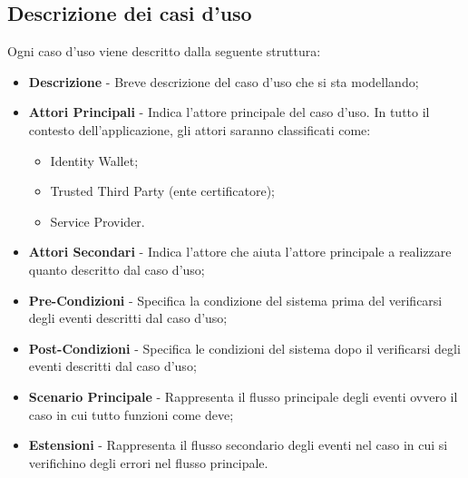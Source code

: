 \subsection{Descrizione dei casi d'uso}
Ogni caso d'uso viene descritto dalla seguente struttura:
\begin{itemize}
	\item \textbf{Descrizione} - Breve descrizione del caso d'uso che si sta modellando;
	\item \textbf{Attori Principali} - Indica l'attore principale del caso d'uso. In tutto il contesto dell'applicazione, gli attori saranno classificati come:
	\begin{itemize}
		\item Identity Wallet;
		\item Trusted Third Party (ente certificatore);
		\item Service Provider.
	\end{itemize}
	\item \textbf{Attori Secondari} - Indica l'attore che aiuta l'attore principale a realizzare quanto descritto dal caso d'uso;
	\item \textbf{Pre-Condizioni} - Specifica la condizione del sistema prima del verificarsi degli eventi descritti dal caso d'uso;
	\item \textbf{Post-Condizioni} - Specifica le condizioni del sistema dopo il verificarsi degli eventi descritti dal caso d'uso;
	\item \textbf{Scenario Principale} - Rappresenta il flusso principale degli eventi ovvero il caso in cui tutto funzioni come deve;
	\item \textbf{Estensioni} - Rappresenta il flusso secondario degli eventi nel caso in cui si verifichino degli errori nel flusso principale.
\end{itemize}

